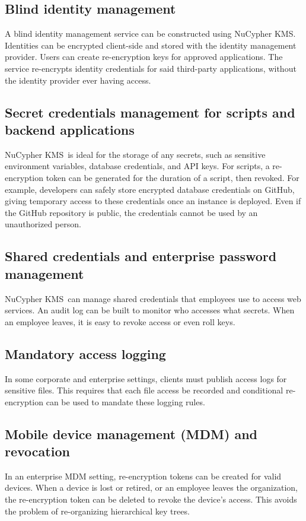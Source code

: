 \documentclass[longbibliography,nofootinbib]{revtex4-1}
\newcommand{\kms}{NuCypher KMS}
\begin{document}
\begin{CJK*}{UTF8}{gbsn}
\subsection{Blind identity management}
A blind identity management service can be constructed using \kms. Identities can be encrypted client-side and stored with the
identity management provider. Users can create re-encryption keys for approved applications. The service re-encrypts identity
credentials for said third-party applications, without the identity provider ever having access.

\subsection{Secret credentials management for scripts and backend applications}
\kms~is ideal for the storage of any secrets, such as sensitive environment variables, database credentials, and API keys.
For scripts, a re-encryption token can be generated for the duration of a script, then revoked.
For example, developers can safely store encrypted database credentials on GitHub, giving temporary access to these credentials
once an instance is deployed.
Even if the GitHub repository is public, the credentials cannot be used by an unauthorized person.

\subsection{Shared credentials and enterprise password management}
\kms~can manage shared credentials that employees use to access web services.
An audit log can be built to monitor who accesses what secrets.
When an employee leaves, it is easy to revoke access or even roll keys.

\subsection{Mandatory access logging}
In some corporate and enterprise settings, clients must publish access logs for sensitive files.
This requires that each file access be recorded and conditional re-encryption can be used to mandate these logging rules.

\subsection{Mobile device management (MDM) and revocation}
\label{sec:mdm}
In an enterprise MDM setting, re-encryption tokens can be created for valid devices. When a device is lost or retired,
or an employee leaves the organization, the re-encryption token can be deleted to revoke the device's access. This avoids the
problem of re-organizing hierarchical key trees.


\end{CJK*}
\end{document}
